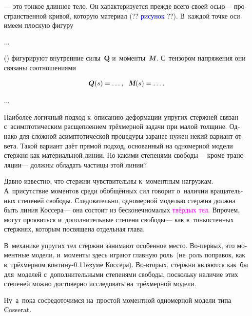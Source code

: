 \begin{otherlanguage}{russian}

\:--- это тонкое длинное тело.
Он характеризуется прежде всего своей осью\:--- пространственной кривой, которую  материал (?? \textcolor{blue}{рисунок} ??).
В~каждой точке оси имеем плоскую фигуру

...

 () фигурируют внутренние силы~$\bm{Q}$ и~моменты~$\mathboldM$.
С~тензором напряжения они связаны соотношениями

\nopagebreak\vspace{-0.2em}\begin{equation}
\bm{Q}(s) = \ldots \hspace{.1ex} ,
\hspace{.6em}
\mathboldM(s) = \ldots \hspace{.1ex} .
\end{equation}

...


Наиболее логичный подход к~описанию деформации упругих стержней связан с~асимптотическим расщеплением трёхмерной задачи при малой толщине.
Однако для сложной асимптотической процедуры заранее нужен некий вариант ответа.
Такой вариант даёт прямой подход, основанный на одномерной модели стержня как материальной линии.
Но какими степенями свободы\:--- кроме трансляции\:--- должны обладать частицы этой линии?

Давно известно, что стержни чувствительны к~моментным нагрузкам.
А~присутствие моментов среди обобщённых сил говорит о~наличии вращательных степеней свободы.
Следовательно, одномерной моделью стержня должна быть линия Коссера\:--- она состоит из бесконечномалых \textcolor{magenta}{твёрдых тел}.
Впрочем, могут проявиться и~дополнительные степени свободы\:--- как в~тонкостенных стержнях, которым посвящена отдельная глава.

В~механике упругих тел стержни занимают особенное место.
Во\hbox{-}первых, это моментные модели, и~моменты здесь играют главную роль~(не~роль поправок, как в~трёхмерном контину\kern-0.11exуме Коссера).
Во\hbox{-}вторых, стержни являются как~бы  для~моделей с~дополнительными степенями свободы, поскольку наличие этих степеней можно достоверно исследовать на~трёх\-мерной модели.

Ну~а~пока сосредоточимся на~простой моментной одномерной модели типа Cosserat.

\end{otherlanguage}

